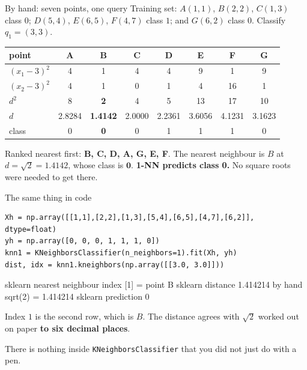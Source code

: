\documentclass[aspectratio=169]{beamer}
\begin{document}
\begin{frame}[shrink=8]{By hand: seven points, one query}
Training set: $A(1,1)$, $B(2,2)$, $C(1,3)$ class $0$;
$D(5,4)$, $E(6,5)$, $F(4,7)$ class $1$; and $G(6,2)$ class $0$.
Classify $q_1 = (3,3)$.
\begin{center}\small
\begin{tabular}{@{}lccccccc@{}}
  \toprule
  point & A & B & C & D & E & F & G\\
  \midrule
  $(x_1-3)^2$ & 4 & 1 & 4 & 4 & 9 & 1 & 9\\
  $(x_2-3)^2$ & 4 & 1 & 0 & 1 & 4 & 16 & 1\\
  \midrule
  $d^2$ & 8 & \textbf{2} & 4 & 5 & 13 & 17 & 10\\
  $d$ & 2.8284 & \textbf{1.4142} & 2.0000 & 2.2361 & 3.6056 & 4.1231 &
    3.1623\\
  class & 0 & \textbf{0} & 0 & 1 & 1 & 1 & 0\\
  \bottomrule
\end{tabular}
\end{center}
\begin{center}\small
  Ranked nearest first: \textbf{B, C, D, A, G, E, F}. The nearest neighbour is
  $B$ at $d = \sqrt{2} = 1.4142$, whose class is $\mathbf{0}$.
  \textbf{1-NN predicts class 0.} No square roots were needed to get there.
\end{center}
\end{frame}

\begin{frame}[fragile,shrink=6]{The same thing in code}
\begin{lstlisting}
Xh = np.array([[1,1],[2,2],[1,3],[5,4],[6,5],[4,7],[6,2]], dtype=float)
yh = np.array([0, 0, 0, 1, 1, 1, 0])
knn1 = KNeighborsClassifier(n_neighbors=1).fit(Xh, yh)
dist, idx = knn1.kneighbors(np.array([[3.0, 3.0]]))
\end{lstlisting}
\begin{outblk}
sklearn nearest neighbour index [1] = point B
sklearn distance 1.414214    by hand sqrt(2) = 1.414214
sklearn prediction 0
\end{outblk}
\begin{center}\small
  Index $1$ is the second row, which is $B$. The distance agrees with
  $\sqrt{2}$ worked out on paper \textbf{to six decimal places}.
\end{center}
\begin{alertblock}{}
  \centering\small
  There is nothing inside \texttt{KNeighborsClassifier} that you did not just
  do with a pen.
\end{alertblock}
\end{frame}
\end{document}
